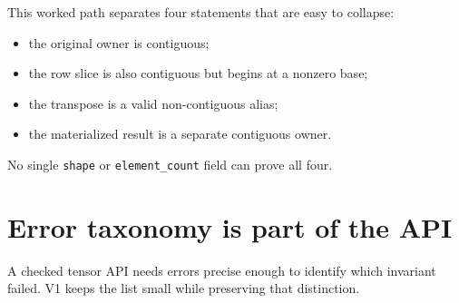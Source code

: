 This worked path separates four statements that are easy to collapse:

\begin{itemize}
\tightlist
\item
  the original owner is contiguous;
\item
  the row slice is also contiguous but begins at a nonzero base;
\item
  the transpose is a valid non-contiguous alias;
\item
  the materialized result is a separate contiguous owner.
\end{itemize}

No single \texttt{shape} or \texttt{element\_count} field can prove all
four.

\section{Error taxonomy is part of the
API}\label{error-taxonomy-is-part-of-the-api}

A checked tensor API needs errors precise enough to identify which
invariant failed. V1 keeps the list small while preserving that
distinction.

